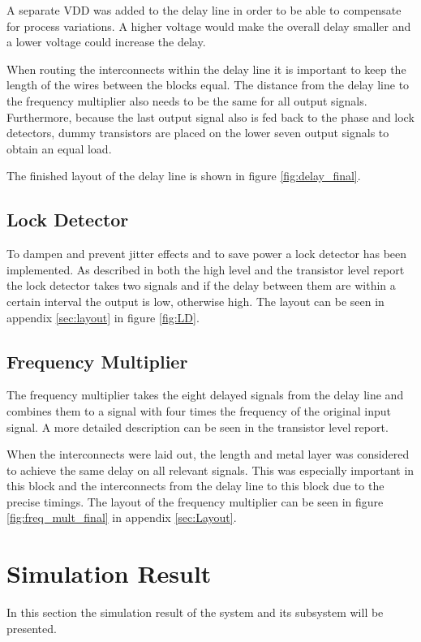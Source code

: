 \documentclass[a4paper,12pt]{article} \usepackage{graphicx}
\begin{document}
A separate VDD was added to the delay line in order to be able to compensate for
process variations. A higher voltage would make the overall delay smaller and a
lower voltage could increase the delay.

When routing the interconnects within the delay line it is important to keep the
length of the wires between the blocks equal. The distance from the delay line
to the frequency multiplier also needs to be the same for all output signals.
Furthermore, because the last output signal also is fed back to the phase and
lock detectors, dummy transistors are placed on the lower seven output signals
to obtain an equal load.

The finished layout of the delay line is shown in figure \ref{fig:delay_final}.

\subsection{Lock Detector}
To dampen and prevent jitter effects and to save power a lock detector
has been implemented. As described in both the high level and the
transistor level report the lock detector takes two signals and if
the delay between them are within a certain interval the output is
low, otherwise high. The layout can be seen in appendix \ref{sec:layout} in figure \ref{fig:LD}.
\subsection{Frequency Multiplier}
The frequency multiplier takes the eight delayed signals from the delay line and
combines them to a signal with four times the frequency of the original input
signal. A more detailed description can be seen in the transistor level report\cite{transistor}.

When the interconnects were laid out, the length and metal layer was considered
to achieve the same delay on all relevant signals. This was especially important
in this block and the interconnects from the delay line to this block due to
the precise timings. The layout of the frequency multiplier can be seen in
figure \ref{fig:freq_mult_final} in appendix \ref{sec:Layout}.


\section{Simulation Result}
In this section the simulation result of the system and its subsystem will be
presented.
\end{document}
